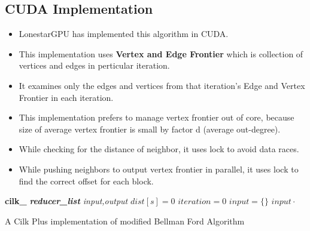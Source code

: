 \documentclass{article}
\begin{document}

\subsection{CUDA Implementation}

\begin{itemize}
\item LonestarGPU has implemented this algorithm in CUDA.
\item This implementation uses \textbf{Vertex and Edge Frontier} which is collection of vertices and edges in perticular iteration.
\item It examines only the edges and vertices from that iteration's Edge and Vertex Frontier in each iteration.
\item This implementation prefers to manage vertex frontier out of core, because size of average vertex frontier is small by factor d (average out-degree).   
\item While checking for the distance of neighbor, it uses lock to avoid data races.
\item While pushing neighbors to output vertex frontier in parallel, it uses lock to find the correct offset for each block.    
\end{itemize}



\IncMargin{1em}
\begin{algorithm}
	\BlankLine 
    \textbf{cilk\_}
	\BlankLine
	\emph{\textbf{reducer\_list} input,output }\;
	\emph{$dist[s] = 0$  }\;
    \emph{$iteration = 0$  }\;
    	\emph{$input = \{\}$}\;
    	\emph{$input\cdot$}\;
	
	\BlankLine
\caption{ A Cilk Plus implementation of modified Bellman Ford Algorithm}\label{algo:Par_SSSP}
\end{algorithm}\DecMargin{1em}
\end{document}
